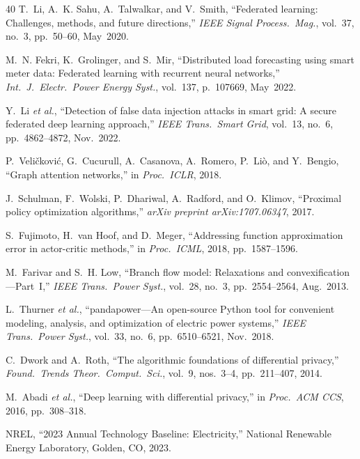 \documentclass[journal]{IEEEtran}
\begin{document}
\begin{thebibliography}{40}
T.~Li, A.~K. Sahu, A.~Talwalkar, and V.~Smith,
``Federated learning: Challenges, methods, and future directions,''
\textit{IEEE Signal Process.\ Mag.}, vol.~37, no.~3, pp.~50--60,
May~2020.

M.~N. Fekri, K.~Grolinger, and S.~Mir,
``Distributed load forecasting using smart meter data: Federated
learning with recurrent neural networks,''
\textit{Int.\ J.~Electr.\ Power Energy Syst.}, vol.~137, p.~107669,
May~2022.

Y.~Li \textit{et al.},
``Detection of false data injection attacks in smart grid: A secure
federated deep learning approach,''
\textit{IEEE Trans.\ Smart Grid}, vol.~13, no.~6, pp.~4862--4872,
Nov.\ 2022.

P.\ Veličković, G.\ Cucurull, A.\ Casanova, A.~Romero, P.~Liò, and
Y.~Bengio,
``Graph attention networks,''
in \textit{Proc.\ ICLR}, 2018.

J.\ Schulman, F.\ Wolski, P.\ Dhariwal, A.\ Radford, and O.\ Klimov,
``Proximal policy optimization algorithms,''
\textit{arXiv preprint arXiv:1707.06347}, 2017.

S.\ Fujimoto, H.\ van Hoof, and D.\ Meger,
``Addressing function approximation error in actor-critic methods,''
in \textit{Proc.\ ICML}, 2018, pp.~1587--1596.

M.\ Farivar and S.~H. Low,
``Branch flow model: Relaxations and convexification---Part~I,''
\textit{IEEE Trans.\ Power Syst.}, vol.~28, no.~3, pp.~2554--2564,
Aug.\ 2013.

L.\ Thurner \textit{et al.},
``pandapower---An open-source Python tool for convenient modeling,
analysis, and optimization of electric power systems,''
\textit{IEEE Trans.\ Power Syst.}, vol.~33, no.~6, pp.~6510--6521,
Nov.\ 2018.

C.\ Dwork and A.\ Roth,
``The algorithmic foundations of differential privacy,''
\textit{Found.\ Trends Theor.\ Comput.\ Sci.}, vol.~9, nos.~3--4,
pp.~211--407, 2014.

M.\ Abadi \textit{et al.},
``Deep learning with differential privacy,''
in \textit{Proc.\ ACM CCS}, 2016, pp.~308--318.

NREL,
``2023 Annual Technology Baseline: Electricity,''
National Renewable Energy Laboratory, Golden, CO, 2023.


\end{thebibliography}
\end{document}

